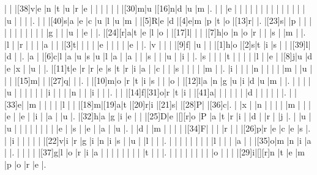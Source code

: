 \documentclass[12pt]{article}
\begin{document}
\begin{Puzzle}{22}{24}
  |{}  |{}  |[38]v|e   |n   |t   |u   |r   |e   |{}  |{}  |{}  |{}  |{}  |{}  |[30]m|u   |[16]n|d   |u   |m   |.
  |{}  |{}  |e   |{}  |{}  |{}  |{}  |{}  |{}  |{}  |{}  |{}  |{}  |{}  |{}  |{}  |{}  |u   |{}  |{}  |{}  |.
  |{}  |{}  |[40]s|a   |e   |c   |u   |l   |u   |m   |{}  |[5]R|e   |d   |[4]e|m   |p   |t   |o   |[13]r|{}  |.
  |[23]s|{}  |p   |{}  |{}  |{}  |{}  |{}  |{}  |{}  |{}  |{}  |{}  |{}  |g   |{}  |{}  |u   |{}  |e   |{}  |.
  |[24][r]a|t   |e   |l   |o   |{}  |[17]l|{}  |{}  |{}  |[7]h|o   |n   |o   |r   |{}  |{}  |s   |{}  |m   |{}  |.
  |l   |{}  |r   |{}  |{}  |{}  |a   |{}  |{}  |[3]t|{}  |{}  |{}  |{}  |e   |{}  |{}  |{}  |{}  |e   |{}  |.
  |v   |{}  |{}  |{}  |[9]f|{}  |u   |{}  |{}  |[1]h|o   |[2]s|t   |i   |s   |{}  |{}  |[39]l|{}  |d   |{}  |.
  |a   |{}  |[6]c|l   |a   |u   |s   |u   |l   |a   |{}  |a   |{}  |{}  |s   |{}  |{}  |u   |{}  |i   |{}  |.
  |s   |{}  |{}  |{}  |t   |{}  |{}  |{}  |{}  |l   |{}  |e   |{}  |[8]j|u   |d   |e   |x   |{}  |u   |{}  |.
  |[11]t|e   |r   |r   |e   |s   |t   |r   |i   |a   |{}  |c   |{}  |{}  |s   |{}  |{}  |{}  |{}  |m   |{}  |.
  |i   |{}  |{}  |{}  |n   |{}  |{}  |{}  |{}  |m   |{}  |u   |{}  |{}  |{}  |[15]m|{}  |{}  |[27]q|{}  |{}  |.
  |{}  |[10]m|o   |r   |t   |i   |s   |{}  |{}  |o   |{}  |[12]l|a   |n   |g   |u   |i   |d   |u   |m   |{}  |.
  |{}  |{}  |{}  |{}  |u   |{}  |{}  |{}  |{}  |{}  |{}  |i   |{}  |{}  |{}  |n   |{}  |{}  |i   |{}  |{}  |.
  |{}  |{}  |[14]f|[31]o|r   |t   |i   |{}  |[41]a|{}  |{}  |{}  |{}  |{}  |{}  |d   |{}  |{}  |{}  |{}  |{}  |.
  |{}  |[33]e|{}  |m   |{}  |{}  |{}  |{}  |l   |{}  |{}  |[18]m|[19]a|t   |[20]r|i   |[21]s|{}  |[28]P|{}  |[36]c|.
  |{}  |x   |{}  |n   |{}  |{}  |{}  |{}  |m   |{}  |{}  |{}  |e   |{}  |e   |{}  |i   |{}  |a   |{}  |u   |.
  |[32]h|a   |g   |i   |e   |{}  |{}  |[25]D|e   |[][r]o   |P   |a   |t   |r   |i   |{}  |d   |{}  |r   |{}  |j   |.
  |{}  |u   |{}  |u   |{}  |{}  |{}  |{}  |{}  |{}  |{}  |{}  |e   |{}  |s   |{}  |e   |{}  |a   |{}  |u   |.
  |{}  |d   |{}  |m   |{}  |{}  |{}  |{}  |[34]F|{}  |{}  |{}  |r   |{}  |{}  |[26]p|r   |e   |c   |e   |s   |.
  |{}  |i   |{}  |{}  |{}  |{}  |{}  |[22]v|i   |r   |g   |i   |n   |i   |s   |{}  |u   |{}  |l   |{}  |{}  |.
  |{}  |{}  |{}  |{}  |{}  |{}  |{}  |{}  |l   |{}  |{}  |{}  |a   |{}  |{}  |[35]o|m   |n   |i   |a   |{}  |.
  |{}  |{}  |{}  |{}  |[37]g|l   |o   |r   |i   |a   |{}  |{}  |{}  |{}  |{}  |{}  |{}  |{}  |t   |{}  |{}  |.
  |{}  |{}  |{}  |{}  |{}  |{}  |{}  |{}  |o   |{}  |{}  |{}  |[29]i|[][r]n   |t   |e   |m   |p   |o   |r   |e   |.
\end{Puzzle}
\end{document}
